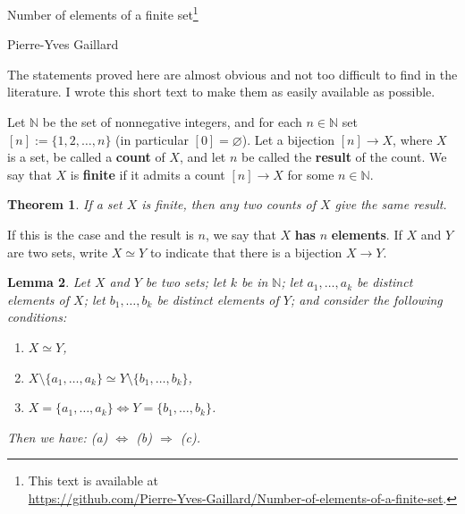 \documentclass[12pt,letterpaper]{article}
\newtheorem{thm}{Theorem}%
\newtheorem{lem}[thm]{Lemma}
\newcommand{\nn}{\noindent}
\newcommand{\N}{\mathbb N}
\begin{document}
\begin{center}
{\large Number of elements of a finite set}\footnote{This text is available at \\ \url{https://github.com/Pierre-Yves-Gaillard/Number-of-elements-of-a-finite-set}.}\medskip 

{\footnotesize Pierre-Yves Gaillard}
\end{center}

\nn The statements proved here are almost obvious and not too difficult to find in the literature. I wrote this short text to make them as easily available as possible. 

Let $\N$ be the set of nonnegative integers, and for each $n\in\N$ set $[n]:=\{1,2,\ldots,n\}$ (in particular $[0]=\varnothing$). Let a bijection $[n]\to X$, where $X$ is a set, be called a \textbf{count} of $X$, and let $n$ be called the \textbf{result} of the count. We say that $X$ is \textbf{finite} if it admits a count $[n]\to X$ for some $n\in\N$. 

\begin{thm}\label{T1}
If a set $X$ is finite, then any two counts of $X$ give the same result. 
\end{thm} 

If this is the case and the result is $n$, we say that $X$ \textbf{has} $n$ \textbf{elements}. If $X$ and $Y$ are two sets, write $X\simeq Y$ to indicate that there is a bijection $X\to Y$. 

\begin{lem}\label{L2} 
Let $X$ and $Y$ be two sets; let $k$ be in $\N$; let $a_1,\ldots, a_k$ be distinct elements of $X$; let $b_1,\ldots, b_k$ be distinct elements of $Y$; and consider the following conditions: 
\begin{enumerate}
 \item[\emph{(a)}] $X\simeq Y$, 
 \item[\emph{(b)}] $X\setminus\{a_1,\ldots, a_k\}\simeq Y\setminus\{b_1,\ldots, b_k\}$, 
 \item[\emph{(c)}] $X=\{a_1,\ldots, a_k\}\Leftrightarrow Y=\{b_1,\ldots, b_k\}$. 
\end{enumerate} 
Then we have: \emph{(a)} $\Leftrightarrow$ \emph{(b)} $\Rightarrow$ \emph{(c)}.
\end{lem} 
\end{document}
